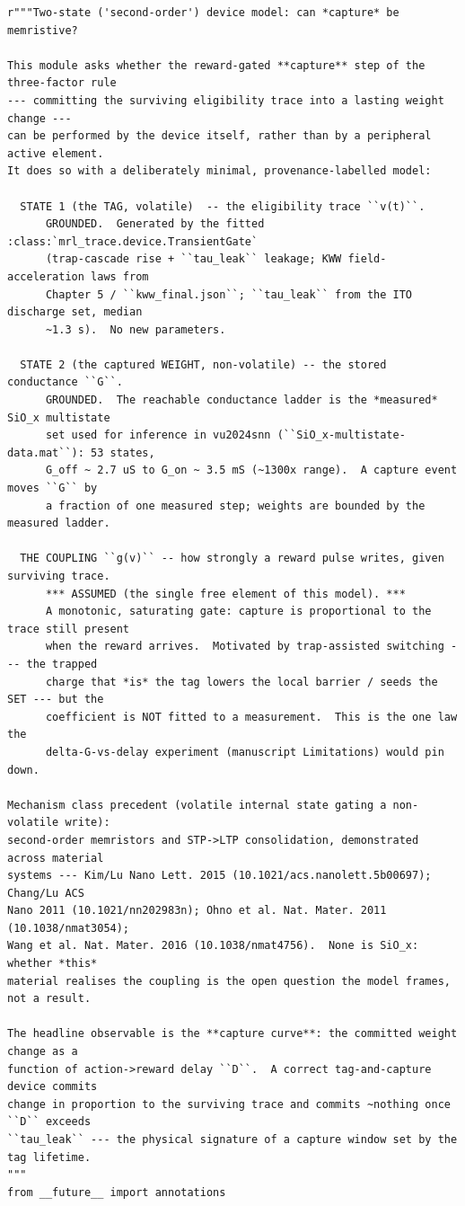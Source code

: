 \begin{lstlisting}[caption={mrl\_trace/capture.py},label={lst:siox-src-capture}]
r"""Two-state ('second-order') device model: can *capture* be memristive?

This module asks whether the reward-gated **capture** step of the three-factor rule
--- committing the surviving eligibility trace into a lasting weight change ---
can be performed by the device itself, rather than by a peripheral active element.
It does so with a deliberately minimal, provenance-labelled model:

  STATE 1 (the TAG, volatile)  -- the eligibility trace ``v(t)``.
      GROUNDED.  Generated by the fitted :class:`mrl_trace.device.TransientGate`
      (trap-cascade rise + ``tau_leak`` leakage; KWW field-acceleration laws from
      Chapter 5 / ``kww_final.json``; ``tau_leak`` from the ITO discharge set, median
      ~1.3 s).  No new parameters.

  STATE 2 (the captured WEIGHT, non-volatile) -- the stored conductance ``G``.
      GROUNDED.  The reachable conductance ladder is the *measured* SiO_x multistate
      set used for inference in vu2024snn (``SiO_x-multistate-data.mat``): 53 states,
      G_off ~ 2.7 uS to G_on ~ 3.5 mS (~1300x range).  A capture event moves ``G`` by
      a fraction of one measured step; weights are bounded by the measured ladder.

  THE COUPLING ``g(v)`` -- how strongly a reward pulse writes, given surviving trace.
      *** ASSUMED (the single free element of this model). ***
      A monotonic, saturating gate: capture is proportional to the trace still present
      when the reward arrives.  Motivated by trap-assisted switching --- the trapped
      charge that *is* the tag lowers the local barrier / seeds the SET --- but the
      coefficient is NOT fitted to a measurement.  This is the one law the
      delta-G-vs-delay experiment (manuscript Limitations) would pin down.

Mechanism class precedent (volatile internal state gating a non-volatile write):
second-order memristors and STP->LTP consolidation, demonstrated across material
systems --- Kim/Lu Nano Lett. 2015 (10.1021/acs.nanolett.5b00697); Chang/Lu ACS
Nano 2011 (10.1021/nn202983n); Ohno et al. Nat. Mater. 2011 (10.1038/nmat3054);
Wang et al. Nat. Mater. 2016 (10.1038/nmat4756).  None is SiO_x: whether *this*
material realises the coupling is the open question the model frames, not a result.

The headline observable is the **capture curve**: the committed weight change as a
function of action->reward delay ``D``.  A correct tag-and-capture device commits
change in proportion to the surviving trace and commits ~nothing once ``D`` exceeds
``tau_leak`` --- the physical signature of a capture window set by the tag lifetime.
"""
from __future__ import annotations


\end{lstlisting}
